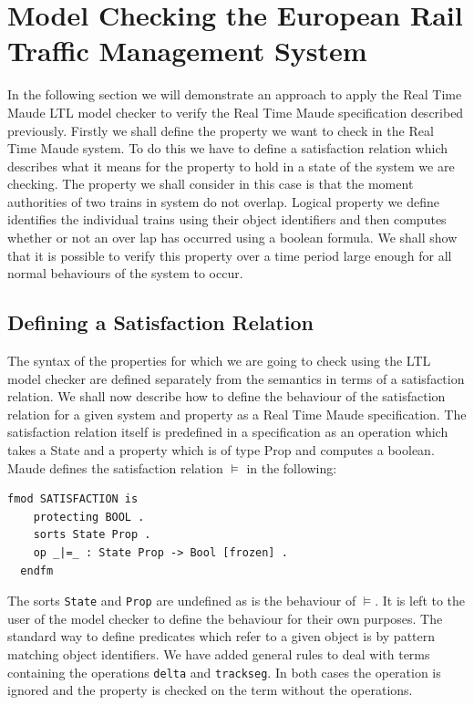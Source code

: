  

\section{Model Checking the European Rail Traffic Management System}
In the following section we will demonstrate an approach to apply the Real Time Maude LTL model checker to verify the Real Time Maude specification described previously.
Firstly we shall define the property we want to check in the Real Time Maude system. To do this we have to define a satisfaction relation which describes what it means for the property to hold in a state of the system we are checking.  The property we shall consider in this case is that the moment authorities of two trains in system do not overlap. Logical property we define identifies the individual trains using their object identifiers and then computes whether or not an over lap has occurred using a boolean formula.  We shall show that it is possible to verify this property over a time period large enough for all normal behaviours of the system to occur. 

\subsection*{Defining a Satisfaction Relation}
The syntax of the properties for which we are going to check using the LTL model checker are defined separately from the semantics in terms of a satisfaction relation.
We shall now describe how to define the behaviour of the satisfaction relation for a given system and property as a Real Time Maude specification. The satisfaction relation itself is predefined in a specification as an operation which takes a State and a property which is of type Prop and computes a boolean. Maude defines the satisfaction relation $\models$ in the following:
\medskip

\begin{lstlisting}[caption =  The Maude Satisfaction module, label =code:satisfaction ]
  fmod SATISFACTION is  
    protecting BOOL .  
    sorts State Prop .  
    op _|=_ : State Prop -> Bool [frozen] .  
  endfm
\end{lstlisting}
\medskip
The sorts \texttt{State} and \texttt{Prop} are undefined as is the behaviour of $\models$. It is left to the user of the model checker to define the behaviour for their own purposes. The standard way to define predicates which refer to a given object is by pattern matching object identifiers. We have added general rules to deal with terms containing the operations \texttt{delta} and \texttt{trackseg}. In both cases the operation is ignored and the property is checked on the term without the operations.

